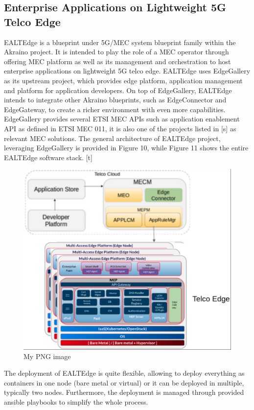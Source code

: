 \documentclass[12pt,a4paper,twoside]{report}
\begin{document}
\subsection{Enterprise Applications on Lightweight 5G Telco Edge}
EALTEdge is a blueprint under 5G/MEC system blueprint family within the Akraino project. It is intended to play the role of a MEC operator through offering MEC platform as well as its management and orchestration to host enterprise applications on lightweight 5G telco edge. EALTEdge uses EdgeGallery as its upstream project, which provides edge platform, application management and platform for application developers. On top of EdgeGallery, EALTEdge intends to integrate other Akraino blueprints, such as EdgeConnector and EdgeGateway, to create a richer environment with even more capabilities. EdgeGallery provides several ETSI MEC APIs such as application enablement API as defined in ETSI MEC 011, it is also one of the projects listed in [s] as relevant MEC solutions. The general architecture of EALTEdge project, leveraging EdgeGallery is provided in Figure 10, while Figure 11 shows the entire EALTEdge software stack. [t]
\begin{figure}[ht]
	\centering
	\includegraphics[width=13cm]{./images/akraino-ealtedge.png} %
	\caption{My PNG image}
\end{figure}

The deployment of EALTEdge is quite flexible, allowing to deploy everything as containers in one node (bare metal or virtual) or it can be deployed in multiple, typically two nodes. Furthermore, the deployment is managed through provided ansible playbooks to simplify the whole process. 
\end{document}
